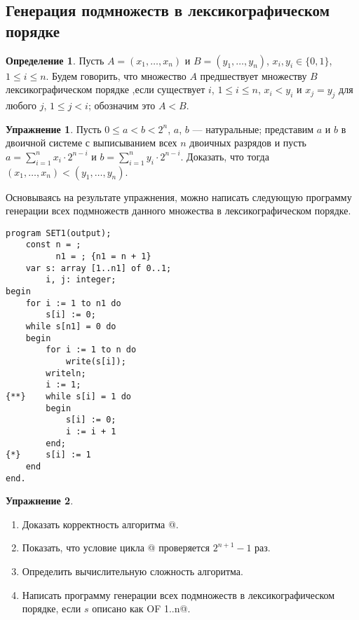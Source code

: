 \documentclass[12pt,a4paper]{article}
\theoremstyle{plain}
\theoremstyle{definition}
\newtheorem{definition}{Определение}
\newtheorem*{task}{Упражнение}
\theoremstyle{remark}
\newtheorem*{comment}{Комментарий}
\begin{document}
\subsection{Генерация подмножеств в лексикографическом порядке}
\label{sec:lex_subsets}

\begin{definition}
Пусть $A=(x_1,\ldots,x_n)$ и $B=(y_1,\ldots,y_n)$, $x_i, y_i \in \{0,1\}$, $1\le i\le n$. Будем говорить, что множество $A$ предшествует множеству $B$ лексикографическом порядке ,если существует $i$, $1\le i\le n$, $x_i<y_i$ и $x_j=y_j$ для любого $j$, $1\le j<i$; обозначим это $A<B$.
\end{definition}

\begin{task}
Пусть $0 \le a < b < 2^n$, $a$, $b$ --- натуральные; представим $a$ и $b$ в двоичной системе с выписыванием всех $n$ двоичных разрядов и пусть $a = \sum_{i=1}^n x_i\cdot 2^{n-i}$ и $b = \sum_{i=1}^n y_i\cdot 2^{n-i}$. Доказать, что тогда $(x_1,\ldots,x_n) < (y_1,\ldots,y_n)$.
\end{task}

Основываясь на результате упражнения, можно написать следующую программу генерации всех подмножеств данного множества в лексикографическом порядке.

\begin{verbatim}
program SET1(output);
    const n = ;
          n1 = ; {n1 = n + 1}
    var s: array [1..n1] of 0..1;
        i, j: integer;
begin
    for i := 1 to n1 do
        s[i] := 0;
    while s[n1] = 0 do
    begin
        for i := 1 to n do
            write(s[i]);
        writeln;
        i := 1;
{**}    while s[i] = 1 do
        begin
            s[i] := 0;
            i := i + 1
        end;
{*}     s[i] := 1
    end
end.
\end{verbatim}

\begin{comment}
Пусть множеству $S$ соответствует число $s$, тогда множеству, следующему за $S$, соответствует число $s+1$.
\end{comment}

\begin{task}
~\\
\begin{enumerate}
\item Доказать корректность алгоритма @.
\item Показать, что условие цикла \verb@{**}@ проверяется $2^{n+1}-1$ раз.
\item Определить вычислительную сложность алгоритма.
\item Написать программу генерации всех подмножеств в лексикографическом порядке, если $s$ описано как \verb@SET OF 1..n@.
\end{enumerate}
\end{task}
\end{document}
